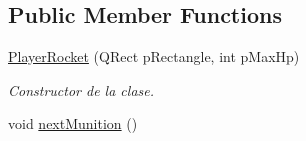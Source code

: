 \subsection*{Public Member Functions}
\begin{DoxyCompactItemize}
\item 
\hyperlink{class_player_rocket_a662448cb29201a9155de519f4563fac3}{Player\-Rocket} (Q\-Rect p\-Rectangle, int p\-Max\-Hp)
\begin{DoxyCompactList}\small\item\em Constructor de la clase. \end{DoxyCompactList}\item 
\hypertarget{class_player_rocket_a61a775b8b7f8bf920e748eaf44af1a49}{void \hyperlink{class_player_rocket_a61a775b8b7f8bf920e748eaf44af1a49}{next\-Munition} ()}\label{class_player_rocket_a61a775b8b7f8bf920e748eaf44af1a49}


\end{DoxyCompactItemize}
